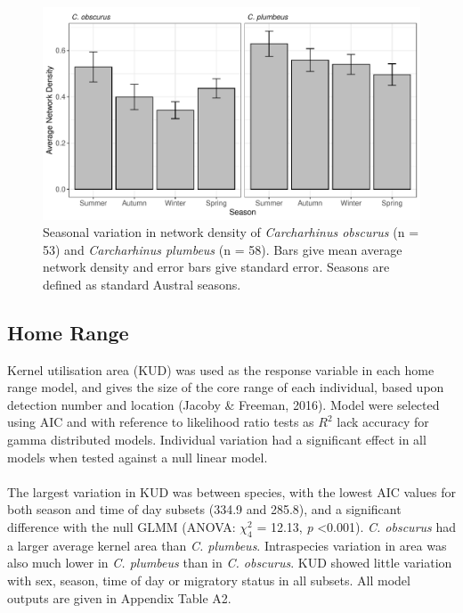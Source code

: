 \documentclass[11pt,a4paper]{article}
\begin{document}
	\begin{figure}[h]
		\centering\includegraphics[width=\textwidth]{../Results/network_season.pdf}
		\caption{Seasonal variation in network density of \textit{Carcharhinus obscurus} (n = 53) and \textit{Carcharhinus plumbeus} (n = 58). Bars give mean average network density and error bars give standard error. Seasons are defined as standard Austral seasons.}
		\label{net_seasons}
	\end{figure}
	
			
	\subsection{Home Range}
	
	Kernel utilisation area (KUD) was used as the response variable in each home range model, and gives the size of the core range of each individual, based upon detection number and location (Jacoby \& Freeman, 2016). Model were selected using AIC and with reference to likelihood ratio tests as $R^2$ lack accuracy for gamma distributed models. Individual variation had a significant effect in all models when tested against a null linear model.\\  
	\\
	The largest variation in KUD was between species, with the lowest AIC values for both season and time of day subsets (334.9 and 285.8), and a significant difference with the null GLMM (ANOVA: $\chi^2_4$ = 12.13, \textit{p} \textless 0.001). \textit{C. obscurus} had a larger average kernel area than \textit{C. plumbeus}. Intraspecies variation in area was also much lower in \textit{C. plumbeus} than in \textit{C. obscurus}. KUD showed little variation with sex, season, time of day or migratory status in all subsets. All model outputs are given in Appendix Table A2. 
	
\end{document}
